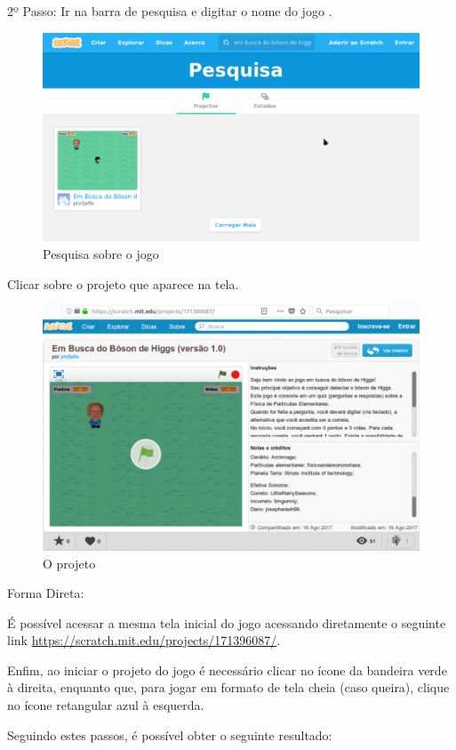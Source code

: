 \documentclass[12pt,fleqn]{book} %
\begin{document}
2º Passo: Ir na barra de pesquisa e digitar o nome do jogo . 

\begin{figure}[h]
	\centering
	\includegraphics[width=0.7 \textwidth]{Produto/pesquisa}
	\caption{Pesquisa sobre o jogo}
	\label{fig:app_pesquisa}
\end{figure}

\newpage

Clicar sobre o projeto que aparece na tela.

\begin{figure}[h]
	\centering
	\includegraphics[width=0.7 \textwidth]{Produto/site_jogo}
	\caption{O projeto}
	\label{fig:app_a:projeto}
\end{figure}

Forma Direta:

É possível acessar a mesma tela inicial do jogo acessando diretamente o seguinte link \url{https://scratch.mit.edu/projects/171396087/}.

Enfim, ao iniciar o projeto do jogo é necessário clicar no ícone da bandeira verde à direita, enquanto que, para jogar em formato de tela cheia (caso queira), clique no ícone retangular azul à esquerda.

Seguindo estes passos, é possível obter o seguinte resultado:
\end{document}

